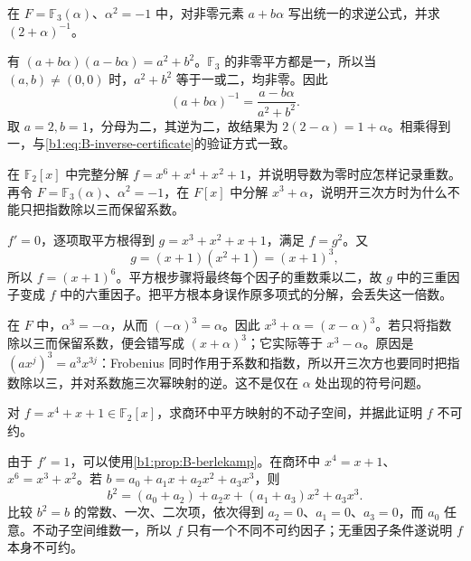 \BookExercises

\begin{exercise}\label{b1:ex:B-field-inverses}
	在 \(F=\mathbb F_3(\alpha)\)、\(\alpha^2=-1\) 中，对非零元素 \(a+b\alpha\) 写出统一的求逆公式，并求 \((2+\alpha)^{-1}\)。
\end{exercise}

\begin{solution}
	有 \((a+b\alpha)(a-b\alpha)=a^2+b^2\)。\(\mathbb F_3\) 的非零平方都是一，所以当 \((a,b)\ne(0,0)\) 时，\(a^2+b^2\) 等于一或二，均非零。因此
	\[
		(a+b\alpha)^{-1}=\frac{a-b\alpha}{a^2+b^2}.
	\]
	取 \(a=2,b=1\)，分母为二，其逆为二，故结果为 \(2(2-\alpha)=1+\alpha\)。相乘得到一，与\eqref{b1:eq:B-inverse-certificate}的验证方式一致。
\end{solution}

\begin{exercise}\label{b1:ex:B-repeated-factors}
	在 \(\mathbb F_2[x]\) 中完整分解 \(f=x^6+x^4+x^2+1\)，并说明导数为零时应怎样记录重数。再令 \(F=\mathbb F_3(\alpha)\)、\(\alpha^2=-1\)，在 \(F[x]\) 中分解 \(x^3+\alpha\)，说明开三次方时为什么不能只把指数除以三而保留系数。
\end{exercise}

\begin{solution}
	\(f'=0\)，逐项取平方根得到 \(g=x^3+x^2+x+1\)，满足 \(f=g^2\)。又
	\[
		g=(x+1)(x^2+1)=(x+1)^3,
	\]
	所以 \(f=(x+1)^6\)。平方根步骤将最终每个因子的重数乘以二，故 \(g\) 中的三重因子变成 \(f\) 中的六重因子。把平方根本身误作原多项式的分解，会丢失这一倍数。

	在 \(F\) 中，\(\alpha^3=-\alpha\)，从而 \((-\alpha)^3=\alpha\)。因此 \(x^3+\alpha=(x-\alpha)^3\)。若只将指数除以三而保留系数，便会错写成 \((x+\alpha)^3\)；它实际等于 \(x^3-\alpha\)。原因是 \((a x^j)^3=a^3x^{3j}\)：Frobenius 同时作用于系数和指数，所以开三次方也要同时把指数除以三，并对系数施三次幂映射的逆。这不是仅在 \(\alpha\) 处出现的符号问题。
\end{solution}

\begin{exercise}\label{b1:ex:B-berlekamp-irreducible}
	对 \(f=x^4+x+1\in\mathbb F_2[x]\)，求商环中平方映射的不动子空间，并据此证明 \(f\) 不可约。
\end{exercise}

\begin{solution}
	由于 \(f'=1\)，可以使用\cref{b1:prop:B-berlekamp}。在商环中 \(x^4=x+1\)、\(x^6=x^3+x^2\)。若 \(b=a_0+a_1x+a_2x^2+a_3x^3\)，则
	\[
		b^2=(a_0+a_2)+a_2x+(a_1+a_3)x^2+a_3x^3.
	\]
	比较 \(b^2=b\) 的常数、一次、二次项，依次得到 \(a_2=0\)、\(a_1=0\)、\(a_3=0\)，而 \(a_0\) 任意。不动子空间维数一，所以 \(f\) 只有一个不同不可约因子；无重因子条件遂说明 \(f\) 本身不可约。
\end{solution}

